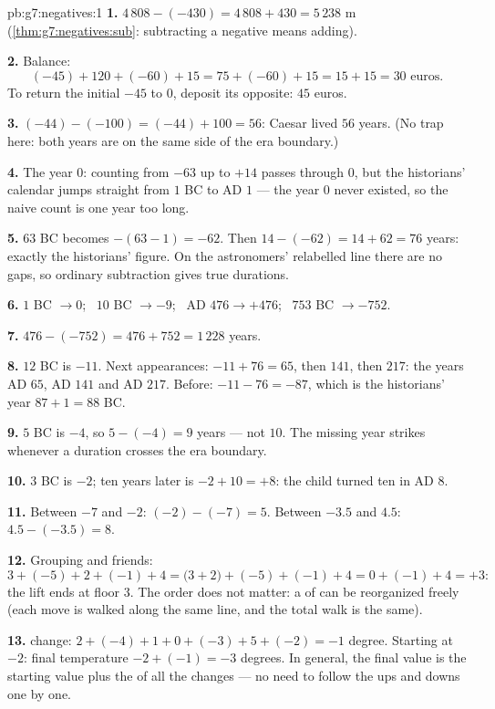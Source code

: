\begin{solution}{pb:g7:negatives:1}
\textbf{1.} $4\,808 - (-430) = 4\,808 + 430 = 5\,238$ m
(\cref{thm:g7:negatives:sub}: subtracting a negative means
adding).

\textbf{2.} Balance:
\[
(-45) + 120 + (-60) + 15 = 75 + (-60) + 15 = 15 + 15 = 30
\text{ euros}.
\]
To return the initial $-45$ to $0$, deposit its opposite:
$45$ euros.

\textbf{3.} $(-44) - (-100) = (-44) + 100 = 56$: Caesar lived
$56$ years. (No trap here: both years are on the same side of
the era boundary.)

\textbf{4.} The year $0$: counting from $-63$ up to $+14$ passes
through $0$, but the historians' calendar jumps straight from
$1$ BC to AD $1$ --- the year $0$ never existed, so the naive
count is one year too long.

\textbf{5.} $63$ BC becomes $-(63 - 1) = -62$. Then
$14 - (-62) = 14 + 62 = 76$ years: exactly the historians'
figure. On the astronomers' relabelled line there are no gaps,
so ordinary subtraction gives true durations.

\textbf{6.} $1$ BC $\to 0$; \ $10$ BC $\to -9$; \ AD
$476 \to +476$; \ $753$ BC $\to -752$.

\textbf{7.} $476 - (-752) = 476 + 752 = 1\,228$ years.

\textbf{8.} $12$ BC is $-11$. Next appearances:
$-11 + 76 = 65$, then $141$, then $217$: the years AD $65$, AD
$141$ and AD $217$. Before: $-11 - 76 = -87$, which is the
historians' year $87 + 1 = 88$ BC.

\textbf{9.} $5$ BC is $-4$, so $5 - (-4) = 9$ years --- not
$10$. The missing year  strikes whenever a duration crosses
the era boundary.

\textbf{10.} $3$ BC is $-2$; ten years later is $-2 + 10 = +8$:
the child turned ten in AD $8$.

\textbf{11.} Between $-7$ and $-2$: $(-2) - (-7) = 5$. Between
$-3.5$ and $4.5$: $4.5 - (-3.5) = 8$.

\textbf{12.} Grouping  and friends:
\[
3 + (-5) + 2 + (-1) + 4
= \bigl(3 + 2\bigr) + (-5) + (-1) + 4
= 0 + (-1) + 4 = +3 :
\]
the lift ends at floor $3$. The order does not matter: a  of
 can be reorganized freely (each move is walked
along the same line, and the total walk is the same).

\textbf{13.}  change:
$2 + (-4) + 1 + 0 + (-3) + 5 + (-2) = -1$ degree. Starting at
$-2$: final temperature $-2 + (-1) = -3$ degrees. In general,
the final value is the starting value plus the  of all the
changes --- no need to follow the ups and downs one by one.


\end{solution}
